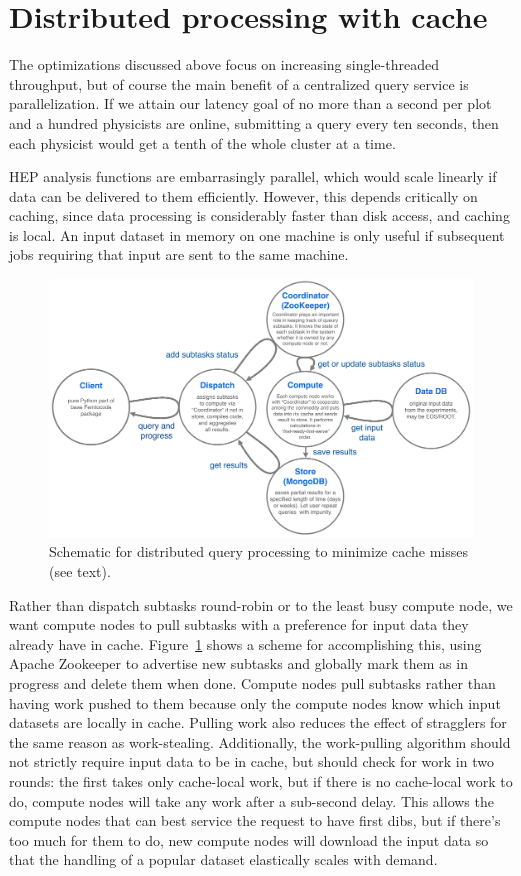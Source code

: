 \documentclass[a4paper]{jpconf}
\begin{document}
\section{Distributed processing with cache}

The optimizations discussed above focus on increasing single-threaded throughput, but of course the main benefit of a centralized query service is parallelization. If we attain our latency goal of no more than a second per plot and a hundred physicists are online, submitting a query every ten seconds, then each physicist would get a tenth of the whole cluster at a time.

HEP analysis functions are embarrasingly parallel, which would scale linearly if data can be delivered to them efficiently. However, this depends critically on caching, since data processing is considerably faster than disk access, and caching is local. An input dataset in memory on one machine is only useful if subsequent jobs requiring that input are sent to the same machine.

\begin{figure}[b]
\begin{center}
\includegraphics[width=0.7\linewidth]{distributed-layout.png}
\end{center}

\caption{\label{fig:distributed} Schematic for distributed query processing to minimize cache misses (see text).}
\end{figure}

Rather than dispatch subtasks round-robin or to the least busy compute node, we want compute nodes to pull subtasks with a preference for input data they already have in cache. Figure~\ref{fig:distributed} shows a scheme for accomplishing this, using Apache Zookeeper to advertise new subtasks and globally mark them as in progress and delete them when done. Compute nodes pull subtasks rather than having work pushed to them because only the compute nodes know which input datasets are locally in cache. Pulling work also reduces the effect of stragglers for the same reason as work-stealing. Additionally, the work-pulling algorithm should not strictly require input data to be in cache, but should check for work in two rounds: the first takes only cache-local work, but if there is no cache-local work to do, compute nodes will take any work after a sub-second delay. This allows the compute nodes that can best service the request to have first dibs, but if there's too much for them to do, new compute nodes will download the input data so that the handling of a popular dataset elastically scales with demand.
\end{document}
